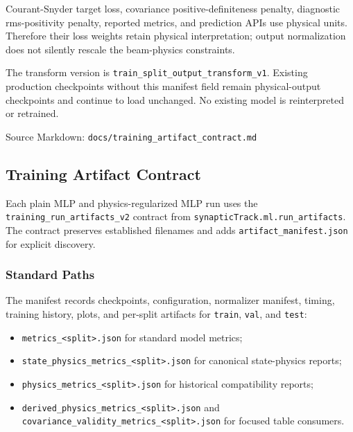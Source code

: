 \documentclass[
]{article}
\providecommand{\tightlist}{%
  \setlength{\itemsep}{0pt}\setlength{\parskip}{0pt}}
\begin{document}
Courant-Snyder target loss, covariance positive-definiteness penalty,
diagnostic rms-positivity penalty, reported metrics, and prediction APIs
use physical units. Therefore their loss weights retain physical
interpretation; output normalization does not silently rescale the
beam-physics constraints.

The transform version is \texttt{train\_split\_output\_transform\_v1}.
Existing production checkpoints without this manifest field remain
physical-output checkpoints and continue to load unchanged. No existing
model is reinterpreted or retrained.

Source Markdown: \texttt{docs/training\_artifact\_contract.md}

\hypertarget{training-artifact-contract}{%
\subsection{Training Artifact
Contract}\label{training-artifact-contract}}

Each plain MLP and physics-regularized MLP run uses the
\texttt{training\_run\_artifacts\_v2} contract from
\texttt{synapticTrack.ml.run\_artifacts}. The contract preserves
established filenames and adds \texttt{artifact\_manifest.json} for
explicit discovery.

\hypertarget{standard-paths}{%
\subsubsection{Standard Paths}\label{standard-paths}}

The manifest records checkpoints, configuration, normalizer manifest,
timing, training history, plots, and per-split artifacts for
\texttt{train}, \texttt{val}, and \texttt{test}:

\begin{itemize}
\tightlist
\item
  \texttt{metrics\_\textless{}split\textgreater{}.json} for standard
  model metrics;
\item
  \texttt{state\_physics\_metrics\_\textless{}split\textgreater{}.json}
  for canonical state-physics reports;
\item
  \texttt{physics\_metrics\_\textless{}split\textgreater{}.json} for
  historical compatibility reports;
\item
  \texttt{derived\_physics\_metrics\_\textless{}split\textgreater{}.json}
  and
  \texttt{covariance\_validity\_metrics\_\textless{}split\textgreater{}.json}
  for focused table consumers.
\end{itemize}
\end{document}

